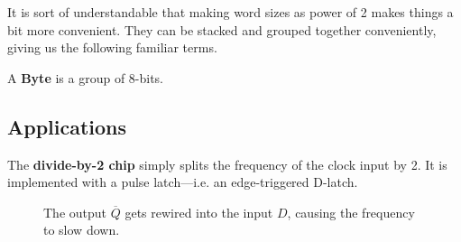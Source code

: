   It is sort of understandable that making word sizes as power of 2 makes things a bit more convenient. They can be stacked and grouped together conveniently, giving us the following familiar terms. 

  \begin{definition}[Byte]
    A \textbf{Byte} is a group of 8-bits. 
  \end{definition}

\subsection{Applications}
  
  \begin{definition}
    The \textbf{divide-by-2 chip} simply splits the frequency of the clock input by 2. It is implemented with a pulse latch---i.e. an edge-triggered D-latch. 

    \begin{figure}[H]
      \centering 
      \caption{The output $\overline{Q}$ gets rewired into the input $D$, causing the frequency to slow down.}
    \end{figure}
  \end{definition}

